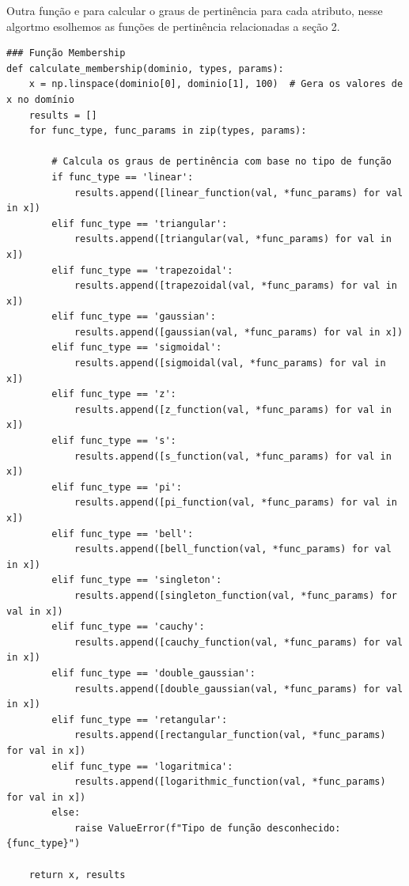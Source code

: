 \documentclass[a4paper,12pt]{article}
\begin{document}
Outra função e para calcular o graus de pertinência para cada atributo, nesse algortmo esolhemos as funções de pertinência relacionadas a seção 2. 

\begin{verbatim}
### Função Membership
def calculate_membership(dominio, types, params):
    x = np.linspace(dominio[0], dominio[1], 100)  # Gera os valores de x no domínio
    results = []
    for func_type, func_params in zip(types, params):
        
        # Calcula os graus de pertinência com base no tipo de função
        if func_type == 'linear':
            results.append([linear_function(val, *func_params) for val in x])  
        elif func_type == 'triangular':
            results.append([triangular(val, *func_params) for val in x])
        elif func_type == 'trapezoidal':
            results.append([trapezoidal(val, *func_params) for val in x])
        elif func_type == 'gaussian':
            results.append([gaussian(val, *func_params) for val in x])
        elif func_type == 'sigmoidal':
            results.append([sigmoidal(val, *func_params) for val in x])
        elif func_type == 'z':
            results.append([z_function(val, *func_params) for val in x])
        elif func_type == 's':
            results.append([s_function(val, *func_params) for val in x])
        elif func_type == 'pi':
            results.append([pi_function(val, *func_params) for val in x])
        elif func_type == 'bell':
            results.append([bell_function(val, *func_params) for val in x])
        elif func_type == 'singleton':
            results.append([singleton_function(val, *func_params) for val in x])
        elif func_type == 'cauchy':
            results.append([cauchy_function(val, *func_params) for val in x])
        elif func_type == 'double_gaussian':
            results.append([double_gaussian(val, *func_params) for val in x])
        elif func_type == 'retangular':
            results.append([rectangular_function(val, *func_params) for val in x])
        elif func_type == 'logaritmica':
            results.append([logarithmic_function(val, *func_params) for val in x])
        else:
            raise ValueError(f"Tipo de função desconhecido: {func_type}")

    return x, results
\end{verbatim}
\end{document}
